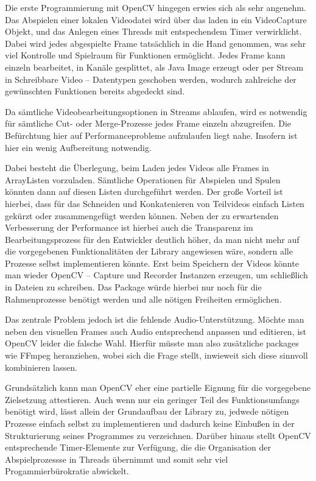Die erste Programmierung mit OpenCV hingegen erwies sich als sehr angenehm. Das Abspielen einer lokalen Videodatei wird über das laden in ein VideoCapture Objekt, und das Anlegen eines Threads mit entspechendem Timer verwirklicht. Dabei wird jedes abgespielte Frame tatsächlich in die Hand genommen, was sehr viel Kontrolle und Spielraum für Funktionen ermöglicht. Jedes Frame kann einzeln bearbeitet, in Kanäle gesplittet, als Java Image erzeugt oder per Stream in Schreibbare Video – Datentypen geschoben werden, wodurch zahlreiche der gewünschten Funktionen bereits abgedeckt sind. 

Da sämtliche Videobearbeitungsoptionen in Streams ablaufen, wird es notwendig für sämtliche Cut- oder Merge-Prozesse jedes Frame einzeln abzugreifen. Die Befürchtung hier auf Performanceprobleme aufzulaufen liegt nahe. Insofern ist hier ein wenig Aufbereitung notwendig. 

Dabei besteht die Überlegung, beim Laden jedes Videos alle Frames in ArrayListen vorzuladen. Sämtliche Operationen  für Abspielen und Spulen könnten dann auf diesen Listen durchgeführt werden. Der große Vorteil ist hierbei, dass für das Schneiden und Konkatenieren von Teilvideos einfach Listen gekürzt oder zusammengefügt werden können. Neben der zu erwartenden Verbesserung der Performance ist hierbei auch die Transparenz im Bearbeitungsprozess für den Entwickler deutlich höher, da man nicht mehr auf die vorgegebenen Funktionalitäten der Library angewiesen wäre, sondern alle Prozesse selbst implementieren könnte. Erst beim Speichern der Videos könnte man wieder OpenCV – Capture und Recorder Instanzen erzeugen, um schließlich in Dateien zu schreiben. Das Package würde hierbei nur noch für die Rahmenprozesse benötigt werden und alle nötigen Freiheiten ermöglichen. 

Das zentrale Problem jedoch ist die fehlende Audio-Unterstützung. Möchte man neben den visuellen Frames auch Audio entsprechend anpassen und editieren, ist OpenCV leider die falsche Wahl. Hierfür müsste man also zusätzliche packages wie FFmpeg heranziehen, wobei sich die Frage stellt, inwieweit sich diese sinnvoll kombinieren lassen.

Grundsätzlich kann man OpenCV eher eine partielle Eignung für die vorgegebene Zielsetzung attestieren. Auch wenn nur ein geringer Teil des Funktionsumfangs benötigt wird, lässt allein der Grundaufbau der Library zu, jedwede nötigen Prozesse einfach selbst zu implementieren und dadurch keine Einbußen in der Strukturierung seines Programmes zu verzeichnen. Darüber hinaus stellt OpenCV entsprechende Timer-Elemente zur Verfügung, die die Organisation der Abspielprozessse in Threads übernimmt und somit sehr viel Progammierbürokratie abwickelt.

